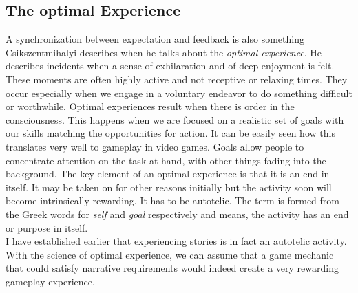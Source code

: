 \subsection{The optimal Experience}
A synchronization between expectation and feedback is also something Csikszentmihalyi describes when he talks about the \textit{optimal experience}. He describes incidents when a sense of exhilaration and of deep enjoyment is felt. These moments are often highly active and not receptive or relaxing times. They occur especially when we engage in a voluntary endeavor to do something difficult or worthwhile. Optimal experiences result when there is order in the consciousness. This happens when we are focused on a realistic set of goals with our skills matching the opportunities for action. It can be easily seen how this translates very well to gameplay in video games. Goals allow people to concentrate attention on the task at hand, with other things fading into the background. The key element of an optimal experience is that it is an end in itself. It may be taken on for other reasons initially but the activity soon will become intrinsically rewarding. It has to be autotelic. The term is formed from the Greek words for \textit{self} and \textit{goal} respectively and means, the activity has an end or purpose in itself.~\cite{Csikszentmihalyi1990}\\
I have established earlier that experiencing stories is in fact an autotelic activity. With the science of optimal experience, we can assume that a game mechanic that could satisfy narrative requirements would indeed create a very rewarding gameplay experience.
